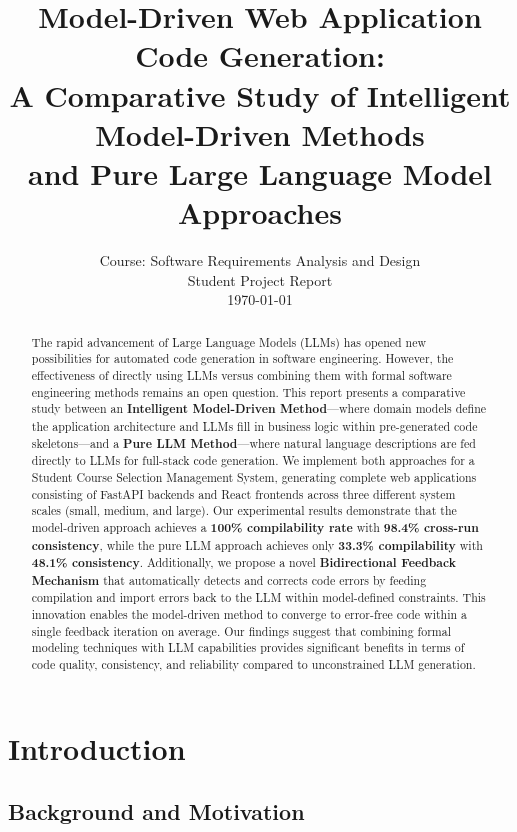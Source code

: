 \documentclass[11pt,a4paper]{article}
\title{\textbf{Model-Driven Web Application Code Generation:\\
A Comparative Study of Intelligent Model-Driven Methods\\
and Pure Large Language Model Approaches}}
\author{Course: Software Requirements Analysis and Design\\
Student Project Report\\
\today}
\date{}
\begin{document}
\maketitle

\begin{abstract}
The rapid advancement of Large Language Models (LLMs) has opened new possibilities for automated code generation in software engineering. However, the effectiveness of directly using LLMs versus combining them with formal software engineering methods remains an open question. This report presents a comparative study between an \textbf{Intelligent Model-Driven Method}---where domain models define the application architecture and LLMs fill in business logic within pre-generated code skeletons---and a \textbf{Pure LLM Method}---where natural language descriptions are fed directly to LLMs for full-stack code generation. We implement both approaches for a Student Course Selection Management System, generating complete web applications consisting of FastAPI backends and React frontends across three different system scales (small, medium, and large). Our experimental results demonstrate that the model-driven approach achieves a \textbf{100\% compilability rate} with \textbf{98.4\% cross-run consistency}, while the pure LLM approach achieves only \textbf{33.3\% compilability} with \textbf{48.1\% consistency}. Additionally, we propose a novel \textbf{Bidirectional Feedback Mechanism} that automatically detects and corrects code errors by feeding compilation and import errors back to the LLM within model-defined constraints. This innovation enables the model-driven method to converge to error-free code within a single feedback iteration on average. Our findings suggest that combining formal modeling techniques with LLM capabilities provides significant benefits in terms of code quality, consistency, and reliability compared to unconstrained LLM generation.
\end{abstract}

\newpage
\tableofcontents
\newpage

\section{Introduction}
\label{sec:intro}

\subsection{Background and Motivation}
\end{document}
